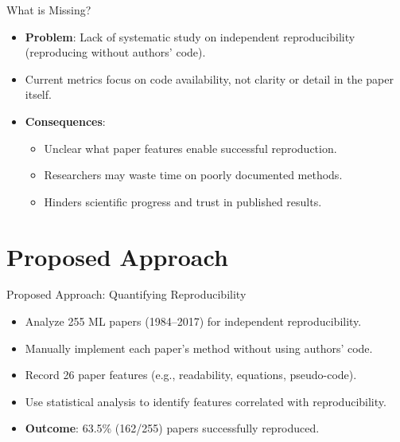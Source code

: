 \documentclass[10pt]{beamer}
\begin{document}
\begin{frame}{What is Missing?}
    \begin{itemize}
        \item \textbf{Problem}: Lack of systematic study on independent reproducibility (reproducing without authors' code).
        \item Current metrics focus on code availability, not clarity or detail in the paper itself.
        \item \textbf{Consequences}:
            \begin{itemize}
                \item Unclear what paper features enable successful reproduction.
                \item Researchers may waste time on poorly documented methods.
                \item Hinders scientific progress and trust in published results.
            \end{itemize}
    \end{itemize}
\end{frame}

\section{Proposed Approach}

\begin{frame}{Proposed Approach: Quantifying Reproducibility}
    \begin{itemize}
        \item Analyze 255 ML papers (1984--2017) for independent reproducibility.
        \item Manually implement each paper’s method without using authors’ code.
        \item Record 26 paper features (e.g., readability, equations, pseudo-code).
        \item Use statistical analysis to identify features correlated with reproducibility.
        \item \textbf{Outcome}: 63.5\% (162/255) papers successfully reproduced.
    \end{itemize}
\end{frame}
\end{document}
